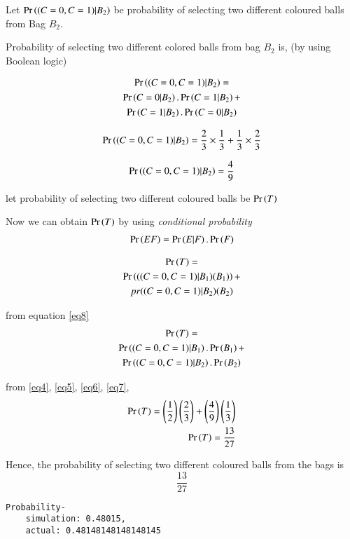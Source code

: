 \documentclass[journal,12pt,twocolumn]{IEEEtran}
\begin{document}
Let $\Pr\left((C=0,C=1)|B_2\right)$ be probability of selecting two different coloured balls from Bag $B_2$.

Probability of selecting two different colored balls from bag $B_2$ is, (by using Boolean logic)

\begin{multline}
    \Pr\left((C=0,C=1)|B_2\right)=\\
    \Pr\left(C=0|B_2\right).\Pr\left(C=1|B_2\right)+\\
    \Pr\left(C=1|B_2\right).\Pr\left(C=0|B_2\right)
\end{multline}

\begin{align}
        \Pr\left((C=0,C=1)|B_2\right)=\frac{2}{3}\times\frac{1}{3}+\frac{1}{3}\times\frac{2}{3}
\end{align}

\begin{align}\label{eq7}
    \Pr\left((C=0,C=1)|B_2\right)=\frac{4}{9}
\end{align}
\newline

let probability of selecting two different coloured balls be $\Pr\left(T\right)$ 
\newline

Now we can obtain $\Pr\left(T\right)$ by using \textit{conditional probability} 
\begin{align}\label{eq8}
    \Pr\left(E F\right)=\Pr\left(E|F\right).\Pr\left(F\right)
\end{align}

\begin{multline}
    \Pr\left(T\right)=\\
    \Pr\left(((C=0,C=1)|B_1)(B_1)\right)+\\
    pr{((C=0,C=1)|B_2)(B_2)}
\end{multline}

from equation \eqref{eq8}
\begin{multline}
    \Pr\left(T\right)=\\
    \Pr\left((C=0,C=1)|B_1\right).\Pr\left(B_1\right)+\\
    \Pr\left((C=0,C=1)|B_2\right).\Pr\left(B_2\right)
\end{multline}

from \eqref{eq4}, \eqref{eq5}, \eqref{eq6}, \eqref{eq7},
\begin{align}
    \Pr\left(T\right)=\left(\frac{1}{2}\right)\left(\frac{2}{3}\right)+\left(\frac{4}{9}\right)\left(\frac{1}{3}\right)\\
    \Pr\left(T\right)=\frac{13}{27}
\end{align}

\vspace{0.2in}

Hence, the probability of selecting two different coloured balls from the bags is \[\frac{13}{27}\]

\begin{lstlisting}
Probability-
    simulation: 0.48015,
    actual: 0.48148148148148145
\end{lstlisting}
\end{document}
